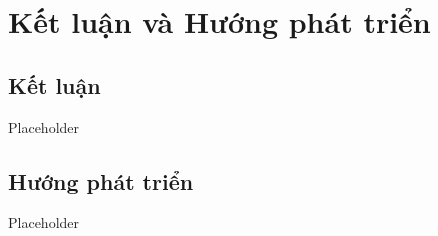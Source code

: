 \chapter{Kết luận và Hướng phát triển}
\label{Chapter5}

\section{Kết luận}

Placeholder

\section{Hướng phát triển}

Placeholder